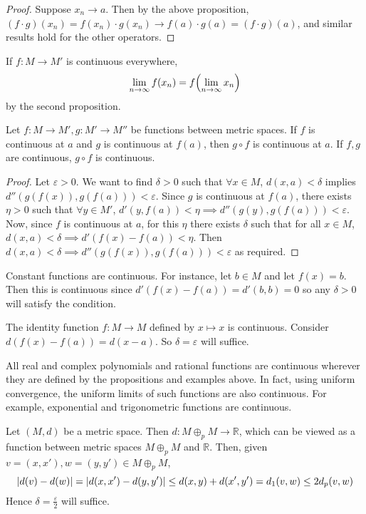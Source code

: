 \begin{proof}
	Suppose \( x_n \to a \).
	Then by the above proposition, \( (f\cdot g)(x_n) = f(x_n) \cdot g(x_n) \to f(a) \cdot g(a) = (f \cdot g)(a) \), and similar results hold for the other operators.
\end{proof}
\begin{remark}
	If \( f \colon M \to M' \) is continuous everywhere,
	\[
		\lim_{n \to \infty} f(x_n) = f\qty(\lim_{n \to \infty} x_n)
	\]
	by the second proposition.
\end{remark}
\begin{proposition}
	Let \( f \colon M \to M', g \colon M' \to M'' \) be functions between metric spaces.
	If \( f \) is continuous at \( a \) and \( g \) is continuous at \( f(a) \), then \( g \circ f \) is continuous at \( a \).
	If \( f,g \) are continuous, \( g \circ f \) is continuous.
\end{proposition}
\begin{proof}
	Let \( \varepsilon > 0 \).
	We want to find \( \delta > 0 \) such that \( \forall x \in M \), \( d(x,a) < \delta \) implies \( d''(g(f(x)), g(f(a))) < \varepsilon \).
	Since \( g \) is continuous at \( f(a) \), there exists \( \eta > 0 \) such that \( \forall y \in M' \), \( d'(y,f(a)) < \eta \implies d''(g(y), g(f(a))) < \varepsilon \).
	Now, since \( f \) is continuous at \( a \), for this \( \eta \) there exists \( \delta \) such that for all \( x \in M \), \( d(x,a) < \delta \implies d'(f(x) - f(a)) < \eta \).
	Then \( d(x,a) < \delta \implies d''(g(f(x)), g(f(a))) < \varepsilon \) as required.
\end{proof}

\begin{example}
	Constant functions are continuous.
	For instance, let \( b \in M \) and let \( f(x) = b \).
	Then this is continuous since \( d'(f(x) - f(a)) = d'(b,b) = 0 \) so any \( \delta > 0 \) will satisfy the condition.
\end{example}
\begin{example}
	The identity function \( f \colon M \to M \) defined by \( x \mapsto x \) is continuous.
	Consider \( d(f(x) - f(a)) = d(x-a) \).
	So \( \delta = \varepsilon \) will suffice.
\end{example}
\begin{example}
	All real and complex polynomials and rational functions are continuous wherever they are defined by the propositions and examples above.
	In fact, using uniform convergence, the uniform limits of such functions are also continuous.
	For example, exponential and trigonometric functions are continuous.
\end{example}
\begin{example}
	Let \( (M, d) \) be a metric space.
	Then \( d \colon M \oplus_p M \to \mathbb R \), which can be viewed as a function between metric spaces \( M \oplus_p M \) and \( \mathbb R \).
	Then, given \( v = (x,x'), w = (y,y') \in M \oplus_p M \),
	\[
		\abs{d(v) - d(w)} = \abs{d(x,x') - d(y,y')} \leq d(x,y) + d(x',y') = d_1(v,w) \leq 2 d_p(v,w)
	\]
	Hence \( \delta = \frac{\varepsilon}{2} \) will suffice.
\end{example}

